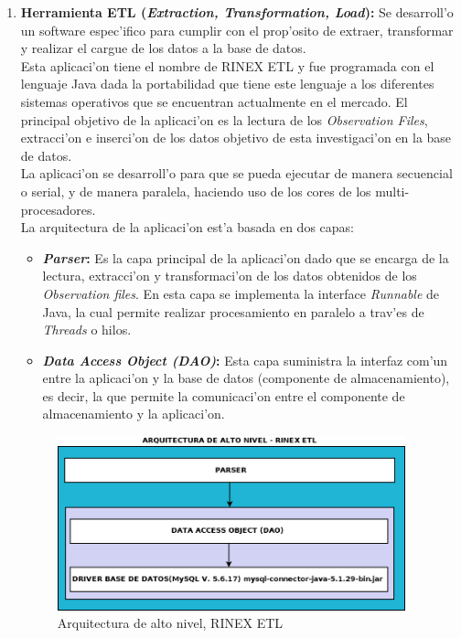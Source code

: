\begin{enumerate}
\item \textbf{Herramienta ETL (\emph{Extraction, Transformation, Load}):} Se desarroll'o un software espec'ifico para cumplir con el prop'osito de extraer, transformar y realizar el cargue de los datos a la base de datos. \\

Esta aplicaci'on tiene el nombre de RINEX ETL y fue programada con el lenguaje Java dada la portabilidad que tiene este lenguaje a los diferentes sistemas operativos que se encuentran actualmente en el mercado.
El principal objetivo de la aplicaci'on es la lectura de los \emph{Observation Files}, extracci'on e inserci'on de los datos objetivo de esta investigaci'on en la base de datos.\\

La aplicaci'on se desarroll'o para que se pueda ejecutar de manera secuencial o serial, y de manera paralela, haciendo uso de los cores de los multi-procesadores.\\

La arquitectura de la aplicaci'on est'a basada en dos capas:

\begin{itemize}
\item \textbf{\emph{Parser}:} Es la capa principal de la aplicaci'on dado que se encarga de la lectura, extracci'on y transformaci'on de los datos obtenidos de los \emph{Observation files}. En esta capa se implementa la interface \emph{Runnable} de Java, la cual permite realizar procesamiento en paralelo a trav'es de \emph{Threads} o hilos.
\item \textbf{\emph{Data Access Object (DAO)}:} Esta capa suministra la interfaz com'un entre la aplicaci'on y la base de datos (componente de almacenamiento), es decir, la que permite la comunicaci'on entre el componente de almacenamiento y la aplicaci'on.
\end{itemize}

\begin{figure}[H]
\centering
\includegraphics[width=0.95\textwidth]{images/ARQUITECTURA_RINEX_ETL}
\caption{Arquitectura de alto nivel, RINEX ETL}
\label{fig:4.4}
\end{figure}


\end{enumerate}
